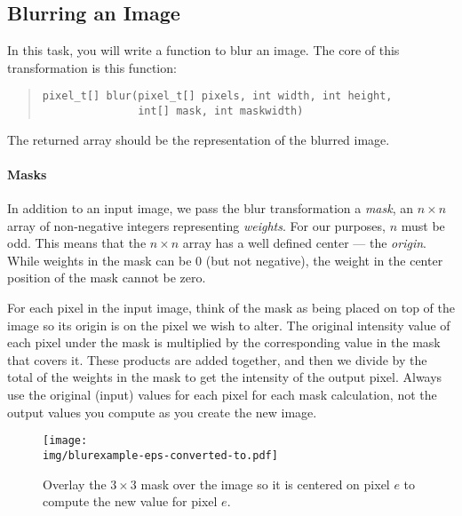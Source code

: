 \subsection{Blurring an Image}
\label{sect:blur}

In this task, you will write a function to blur an image. The core of this
transformation is this function:
\begin{quote}
\begin{lstlisting}
pixel_t[] blur(pixel_t[] pixels, int width, int height,
               int[] mask, int maskwidth)
\end{lstlisting}
\end{quote}
The returned array should be the representation of the blurred image.

\paragraph{Masks}
In addition to an input image, we pass the blur transformation a
\emph{mask}, an $n \times n$ array of non-negative integers
representing \emph{weights}.  For our purposes, $n$ must be odd. This
means that the $n \times n$ array has a well defined center --- the
\emph{origin}.  While weights in the mask can be 0 (but not negative),
the weight in the center position of the mask cannot be zero.

For each pixel in the input image, think of the mask as being placed
on top of the image so its origin is on the pixel we wish to
alter. The original intensity value of each pixel under the mask is
multiplied by the corresponding value in the mask that covers it.
These products are added together, and then we divide by the total of
the weights in the mask to get the intensity of the output pixel. Always
use the original (input) values for each pixel for each mask calculation, not
the output values you compute as you create the new image.


\begin{figure}
  \begin{minipage}[c]{0.6\textwidth}\centering
    \texttt{[image: \\img/blurexample-eps-converted-to.pdf]}
  \end{minipage}\hfill
  \begin{minipage}[c]{0.37\textwidth}
    \caption{Overlay the $3 \times 3$ mask over the image so it is centered on
      pixel $e$ to compute the new value for pixel $e$.}
    \label{fig:blur-exampleA}
  \end{minipage}
\end{figure}

